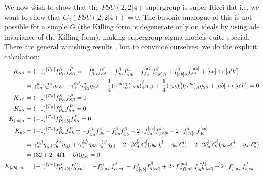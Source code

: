 \documentclass[12pt]{article}
\numberwithin{equation}{section}
\newcommand{\h}[1]{\hat{#1}}
\begin{document}
We now wish to show that the $PSU(2,2|4)$ supergroup is super-Ricci flat i.e. we want to show that $C_2(PSU(2,2|4)) = 0$. The bosonic analogue of this is not possible for a simple $G$ (the Killing form is degenerate only on ideals by using ad-invariance of the Killing form), making supergroup sigma models quite special. There are general vanishing results \cite{Babichenko:2006uc}, but to convince ourselves, we do the explicit calculation:
{\allowdisplaybreaks
\begin{align}
	K_{\alpha \hat{\alpha}} &= (-1)^{\abs{T_P}} f^S_{P \alpha} f^P_{S \h{\alpha}} = -f^a_{\beta \alpha} f^{\beta}_{a \h{\alpha}} + f^{\h{\beta}}_{a\alpha} f_{\h{\beta}\h{\alpha}}^a- f^{[ab]}_{\h{\beta} \alpha} f^{\h{\beta}}_{[ab]\h{\alpha}} + f^{\beta}_{[ab]\alpha}f_{\beta\h{\alpha}}^{[ab]} + [ab] \leftrightarrow [a'b'] \nonumber\\
				&= \gamma^a_{\beta \alpha} \gamma_a^{\alpha \beta} \eta_{\alpha \h{\alpha}} - \gamma^{\h{\alpha}\h{\beta}}_a  \gamma^a_{\h{\beta}\h{\alpha}} \eta_{\alpha \h{\alpha}}- \frac{1}{4} (\gamma^{ab})^\gamma_{\alpha} (\gamma_{ab})^{\h{\beta}}_{\h{\alpha}} \eta_{\gamma \h{\beta}} + \frac{1}{4} (\gamma_{ab})_\alpha^\beta (\gamma^{ab})^\gamma_\beta \eta_{\gamma \h{\alpha}} + [ab] \leftrightarrow [a'b'] = 0 \nonumber \\
	K_{\alpha \beta} &= (-1)^{\abs{T_P}} f^S_{P \alpha} f^P_{S \beta} = 0 \nonumber \\
	K_{a \alpha} &= (-1)^{\abs{T_P}} f^S_{P a} f^P_{S \alpha} = 0 \nonumber \\
	K_{[ab] \alpha} &= (-1)^{\abs{T_P}} f^S_{P [ab]} f^P_{S \alpha} = 0  \nonumber \\
	K_{ab} &= (-1)^{\abs{T_P}} f^S_{P a} f^P_{S b} = -f^\beta_{\h{\beta} a} f^{\h{\beta}}_{\beta b} - f^{\h{\beta}}_{\beta a} f^\beta_{\h{\beta} b} + 2\cdot f^{[ce]}_{d a} f^{d}_{[ce] b} + 2\cdot f_{[ce] a}^d f^{[ce]}_{d b}  \nonumber \\
	       &= \gamma_a^{\alpha \beta} \eta_{\alpha \h{\beta}} \gamma_b^{\h{\delta}\h{\beta}} \eta_{\beta \h{\delta}} +  \gamma_a^{\h{\alpha} \h{\beta}}\eta_{\beta \h{\alpha}} \gamma_b^{\delta \beta}\eta_{\delta \h{\beta}} - 2\cdot 2\delta^{[c}_d \delta^{e]}_a (\eta_{bc}\delta^d_e - \eta_{b e}\delta^d_c) - 2\cdot 2\delta^{[c}_d \delta^{e]}_b (\eta_{ac}\delta^d_e - \eta_{a e}\delta^d_c) \nonumber \\
	       &= (32 + 2\cdot 4(1-5))\eta_{ab} = 0 \nonumber \\
	K_{[ab][cd]} &= (-1)^{\abs{T_P}} f^S_{P [ab]} f^P_{S [cd]} = - f^\alpha_{\beta [ab]} f^{\beta}_{\alpha [cd]} - f^{\h{\alpha}}_{\h{\beta} [ab]} f^{\h{\beta}}_{\h{\alpha} [cd]} +2\cdot f_{[ef][ab]}^{[gh]} f^{[ef]}_{[gh][cd]} + 2\cdot f^e_{f[ab]} f^{f}_{e[cd]} \nonumber \\

\end{align}}
\end{document}
